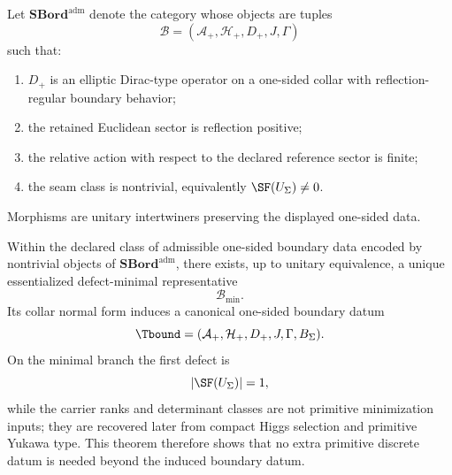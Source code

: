 \begin{definition}
\label{def:admissible-spectral-bordism-category}
Let $\mathbf{SBord}^{\mathrm{adm}}$ denote the category whose objects are tuples
\begin{equation}
\mathcal B=(\mathcal A_+,\mathcal H_+,D_+,J,\Gamma)
\end{equation}
such that:
\begin{enumerate}[label=(\roman*), leftmargin=1.5em, topsep=3pt, itemsep=2pt]
    \item $D_+$ is an elliptic Dirac-type operator on a one-sided collar with reflection-regular
    boundary behavior;
    \item the retained Euclidean sector is reflection positive;
    \item the relative action with respect to the declared reference sector is finite;
    \item the seam class is nontrivial, equivalently $\SF(U_\Sigma)\neq 0$.
\end{enumerate}
Morphisms are unitary intertwiners preserving the displayed one-sided data.
\end{definition}

\begin{theorem}
\label{thm:initial-admissible-bordism}
Within the declared class of admissible one-sided boundary data encoded by nontrivial objects of
$\mathbf{SBord}^{\mathrm{adm}}$, there exists, up to unitary equivalence, a unique essentialized
defect-minimal representative
\begin{equation}
\mathcal B_{\min}.
\end{equation}
Its collar normal form induces a canonical one-sided boundary datum
\begin{equation}
\Tbound=(\mathcal A_+,\mathcal H_+,D_+,J,\Gamma,B_\Sigma).
\end{equation}
On the minimal branch the first defect is
\begin{equation}
|\SF(U_\Sigma)|=1,
\end{equation}
while the carrier ranks and determinant classes are not primitive minimization inputs; they are
recovered later from compact Higgs selection and primitive Yukawa type. This theorem therefore shows
that no extra primitive discrete datum is needed beyond the induced boundary datum.
\end{theorem}

